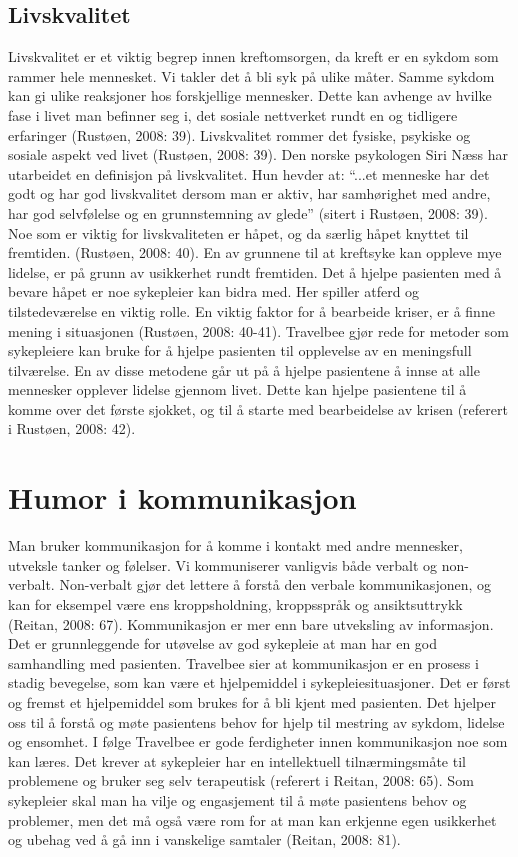 \subsection{Livskvalitet}

Livskvalitet er et viktig begrep innen kreftomsorgen, da kreft er en sykdom som
rammer hele mennesket. Vi takler det å bli syk på ulike måter. Samme sykdom kan
gi ulike reaksjoner hos forskjellige mennesker. Dette kan avhenge av hvilke
fase i livet man befinner seg i, det sosiale nettverket rundt en og tidligere
erfaringer (Rustøen, 2008: 39).  Livskvalitet rommer det fysiske, psykiske og
sosiale aspekt ved livet (Rustøen, 2008: 39). Den norske psykologen Siri Næss
har utarbeidet en definisjon på livskvalitet. Hun hevder at: “...et menneske
har det godt og har god livskvalitet dersom man er aktiv, har samhørighet med
andre, har god selvfølelse og en grunnstemning av glede” (sitert i Rustøen,
2008: 39). Noe som er viktig for livskvaliteten er håpet, og da særlig håpet
knyttet til fremtiden. (Rustøen, 2008: 40).  En av grunnene til at kreftsyke
kan oppleve mye lidelse, er på grunn av usikkerhet rundt fremtiden. Det å
hjelpe pasienten med å bevare håpet er noe sykepleier kan bidra med. Her
spiller atferd og tilstedeværelse en viktig rolle. En viktig faktor for å
bearbeide kriser, er å finne mening i situasjonen (Rustøen, 2008: 40-41).
Travelbee gjør rede for metoder som sykepleiere kan bruke for å hjelpe
pasienten til opplevelse av en meningsfull tilværelse. En av disse metodene går
ut på å hjelpe pasientene å innse at alle mennesker opplever lidelse gjennom
livet. Dette kan hjelpe pasientene til å komme over det første sjokket, og til
å starte med bearbeidelse av krisen (referert i Rustøen, 2008: 42).

\section{Humor i kommunikasjon}

Man bruker kommunikasjon for å komme i kontakt med andre mennesker, utveksle
tanker og følelser. Vi kommuniserer vanligvis både verbalt og non-verbalt.
Non-verbalt gjør det lettere å forstå den verbale kommunikasjonen, og kan for
eksempel være ens kroppsholdning, kroppsspråk og ansiktsuttrykk (Reitan, 2008:
67).  Kommunikasjon er mer enn bare utveksling av informasjon. Det er
grunnleggende for utøvelse av god sykepleie at man har en god samhandling med
pasienten. Travelbee sier at kommunikasjon er en prosess i stadig bevegelse,
som kan være et hjelpemiddel i sykepleiesituasjoner. Det er først og fremst et
hjelpemiddel som brukes for å bli kjent med pasienten. Det hjelper oss til å
forstå og møte pasientens behov for hjelp til mestring av sykdom, lidelse og
ensomhet. I følge Travelbee er gode ferdigheter innen kommunikasjon noe som kan
læres. Det krever at sykepleier har en intellektuell tilnærmingsmåte til
problemene og bruker seg selv terapeutisk (referert i Reitan, 2008: 65). Som
sykepleier skal man ha vilje og engasjement til å møte pasientens behov og
problemer, men det må også være rom for at man kan erkjenne egen usikkerhet og
ubehag ved å gå inn i vanskelige samtaler (Reitan, 2008: 81).

